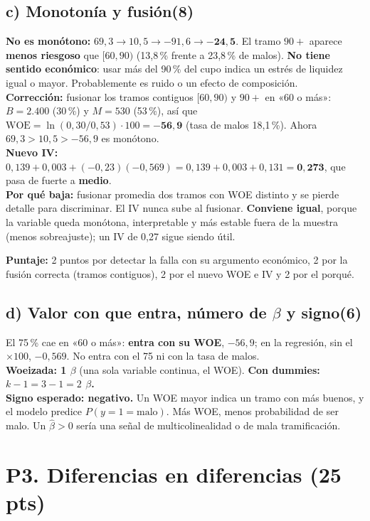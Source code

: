 \documentclass[11pt,a4paper]{article}
\newcommand{\sub}[2]{\subsection*{#1\hfill{\normalsize\textbf{(#2)}}}}
\begin{document}
\sub{c) Monotonía y fusión}{8}
\begin{ejemplar}
\textbf{No es monótono:} $69{,}3\to10{,}5\to-91{,}6\to\mathbf{-24{,}5}$. El tramo $90+$ aparece \textbf{menos riesgoso} que $[60,90)$ (13,8\,\% frente a 23,8\,\% de malos). \textbf{No tiene sentido económico}: usar más del 90\,\% del cupo indica un estrés de liquidez igual o mayor. Probablemente es ruido o un efecto de composición.\\
\textbf{Corrección:} fusionar los tramos contiguos $[60,90)$ y $90+$ en «60 o más»: $B=2.400$ (30\,\%) y $M=530$ (53\,\%), así que $\text{WOE}=\ln(0{,}30/0{,}53)\cdot100=\mathbf{-56{,}9}$ (tasa de malos 18,1\,\%). Ahora $69{,}3>10{,}5>-56{,}9$ es monótono.\\
\textbf{Nuevo IV:} $0{,}139+0{,}003+(-0{,}23)(-0{,}569)=0{,}139+0{,}003+0{,}131=\mathbf{0{,}273}$, que pasa de fuerte a \textbf{medio}.\\
\textbf{Por qué baja:} fusionar promedia dos tramos con WOE distinto y se pierde detalle para discriminar. El IV nunca sube al fusionar. \textbf{Conviene igual}, porque la variable queda monótona, interpretable y más estable fuera de la muestra (menos sobreajuste); un IV de 0,27 sigue siendo útil.
\end{ejemplar}
\textbf{Puntaje:} 2 puntos por detectar la falla con su argumento económico, 2 por la fusión correcta (tramos contiguos), 2 por el nuevo WOE e IV y 2 por el porqué.

\sub{d) Valor con que entra, número de $\beta$ y signo}{6}
\begin{ejemplar}
El 75\,\% cae en «60 o más»: \textbf{entra con su WOE}, $-56{,}9$; en la regresión, sin el $\times100$, \textbf{$-0{,}569$}. No entra con el 75 ni con la tasa de malos.\\
\textbf{Woeizada: 1 $\beta$} (una sola variable continua, el WOE). \textbf{Con dummies: $k-1=3-1=2$ $\beta$.}\\
\textbf{Signo esperado: negativo.} Un WOE mayor indica un tramo con más buenos, y el modelo predice $P(y=1=\text{malo})$. Más WOE, menos probabilidad de ser malo. Un $\hat\beta>0$ sería una señal de multicolinealidad o de mala tramificación.
\end{ejemplar}

\section*{P3. Diferencias en diferencias (25 pts)}
\end{document}
